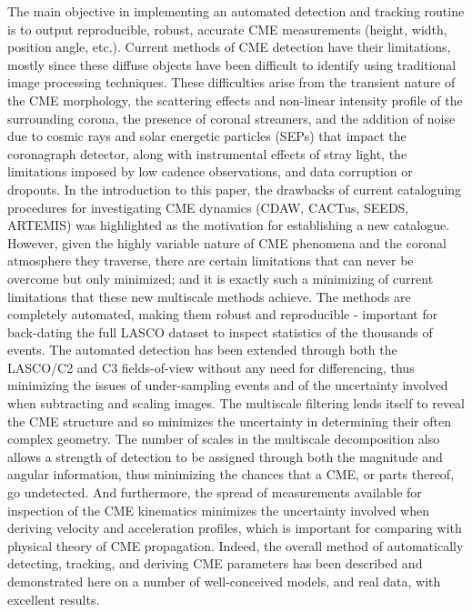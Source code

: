 \documentclass[preprint2]{aastex}
\begin{document}
The main objective in implementing an automated detection and tracking routine is to output reproducible, robust, accurate CME measurements (height, width, position angle, etc.). Current methods of CME detection have their limitations, mostly since these diffuse objects have been difficult to identify using traditional image processing techniques. These difficulties arise from the transient nature of the CME morphology, the scattering effects and non-linear intensity profile of the surrounding corona, the presence of coronal streamers, and the addition of noise due to cosmic rays and solar energetic particles (SEPs) that impact the coronagraph detector, along with instrumental effects of stray light, the limitations imposed by low cadence observations, and data corruption or dropouts. In the introduction to this paper, the drawbacks of current cataloguing procedures for investigating CME dynamics (CDAW, CACTus, SEEDS, ARTEMIS) was highlighted as the motivation for establishing a new catalogue. However, given the highly variable nature of CME phenomena and the coronal atmosphere they traverse, there are certain limitations that can never be overcome but only minimized; and it is exactly such a minimizing of current limitations that these new multiscale methods achieve. The methods are completely automated, making them robust and reproducible - important for back-dating the full LASCO dataset to inspect statistics of the thousands of events. The automated detection  has been extended through both the LASCO/C2 and C3 fields-of-view without any need for differencing, thus minimizing the issues of under-sampling events and of the uncertainty involved when subtracting and scaling images. The multiscale filtering lends itself to reveal the CME structure and so minimizes the uncertainty in determining their often complex geometry. The number of scales in the multiscale decomposition also allows a strength of detection to be assigned through both the magnitude and angular information, thus minimizing the chances that a CME, or parts thereof, go undetected. And furthermore, the spread of measurements available for inspection of the CME kinematics minimizes the uncertainty involved when deriving velocity and acceleration profiles, which is important for comparing with physical theory of CME propagation. Indeed, the overall method of automatically detecting, tracking, and deriving CME parameters has been described and demonstrated here on a number of well-conceived models, and real data, with excellent results.
\end{document}
